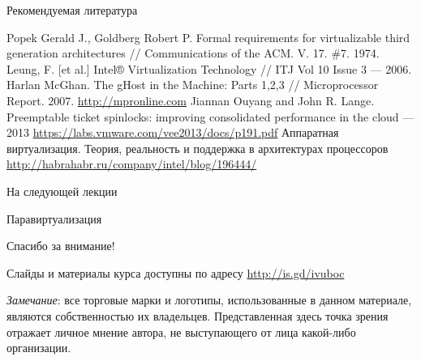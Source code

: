 \begin{frame}[allowframebreaks]{Рекомендуемая литература}
\begin{thebibliography}{99}
 Popek Gerald J., Goldberg Robert P. Formal requirements for virtualizable third generation architectures // Communications of the ACM. V. 17. \#7. 1974.
 Leung, F. [et al.] Intel® Virtualization Technology // ITJ Vol 10 Issue 3 — 2006.
 Harlan McGhan. The gHost in the Machine: Parts 1,2,3 // Microprocessor Report. 2007. \url{http://mpronline.com}
 Jiannan Ouyang and John R. Lange. Preemptable ticket spinlocks: improving consolidated performance in the cloud — 2013 \url{https://labs.vmware.com/vee2013/docs/p191.pdf}
 Аппаратная виртуализация. Теория, реальность и поддержка в архитектурах процессоров \url{http://habrahabr.ru/company/intel/blog/196444/}
\end{thebibliography}
\end{frame}


\begin{frame}{На следующей лекции}
\centering

Паравиртуализация

\end{frame}


\begin{frame}

{\huge{Спасибо за внимание!}\par}

\vfill

Слайды и материалы курса доступны по адресу \url{http://is.gd/ivuboc} %

\vfill

\tiny{\textit{Замечание}: все торговые марки и логотипы, использованные в данном материале, являются собственностью их владельцев. Представленная здесь точка зрения отражает личное мнение автора, не выступающего от лица какой-либо организации.}

\end{frame}


